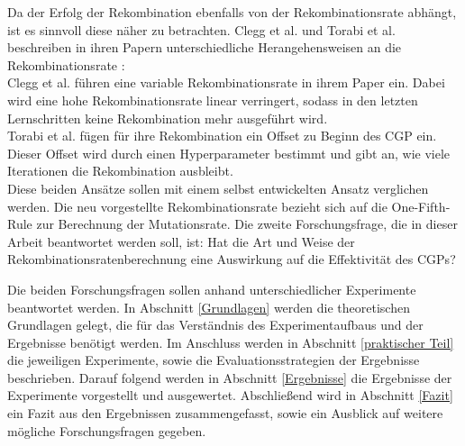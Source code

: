 Da der Erfolg der Rekombination ebenfalls von der Rekombinationsrate abhängt, ist es sinnvoll diese näher zu betrachten. 
Clegg et al. und Torabi et al. beschreiben in ihren Papern unterschiedliche Herangehensweisen an die Rekombinationsrate \cite{clegg_new_2007, torabi_using_2022}:\\
Clegg et al. führen eine variable Rekombinationsrate in ihrem Paper ein.
Dabei wird eine hohe Rekombinationsrate linear verringert, sodass in den letzten Lernschritten keine Rekombination mehr ausgeführt wird. \cite{clegg_new_2007}\\
Torabi et al. fügen für ihre Rekombination ein Offset zu Beginn des CGP ein. 
Dieser Offset wird durch einen Hyperparameter bestimmt und gibt an, wie viele Iterationen die Rekombination ausbleibt. \cite{torabi_using_2022}\\
Diese beiden Ansätze sollen mit einem selbst entwickelten Ansatz verglichen werden.
Die neu vorgestellte Rekombinationsrate bezieht sich auf die One-Fifth-Rule zur Berechnung der Mutationsrate.
Die zweite Forschungsfrage, die in dieser Arbeit beantwortet werden soll, ist: \glqq Hat die Art und Weise der Rekombinationsratenberechnung eine Auswirkung auf die Effektivität des CGPs?\grqq

Die beiden Forschungsfragen sollen anhand unterschiedlicher Experimente beantwortet werden.
In Abschnitt \ref{Grundlagen} werden die theoretischen Grundlagen gelegt, die für das Verständnis des Experimentaufbaus und der Ergebnisse benötigt werden.
Im Anschluss werden in Abschnitt \ref{praktischer Teil} die jeweiligen Experimente, sowie die Evaluationsstrategien der Ergebnisse beschrieben.
Darauf folgend werden in Abschnitt \ref{Ergebnisse} die Ergebnisse der Experimente vorgestellt und ausgewertet.
Abschließend wird in Abschnitt \ref{Fazit} ein Fazit aus den Ergebnissen zusammengefasst, sowie ein Ausblick auf weitere mögliche Forschungsfragen gegeben.
